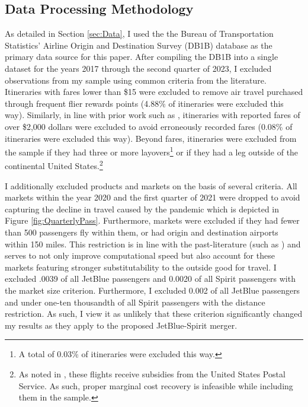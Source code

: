 \documentclass{article}
\begin{document}
\begin{appendices}
    
\setcounter{table}{0}
\setcounter{figure}{0}
\renewcommand{\thetable}{\Alph{section}\arabic{table}}
\renewcommand{\thefigure}{\Alph{section}\arabic{figure}}

	\section{Data Processing Methodology}
	\label{sec:DataProcessing}
	As detailed in Section \ref{sec:Data},	I used the the Bureau of Transportation Statistics' Airline Origin and Destination Survey (DB1B) database as the primary data source for this paper. After compiling the DB1B into a single dataset for the years 2017 through the second quarter of 2023, I excluded observations from my sample using common criteria from the literature. Itineraries with fares lower than \$15 were excluded to remove air travel purchased through frequent flier rewards points (4.88\% of itineraries were excluded this way). Similarly, in line with prior work such as \citet{berry_tracing_2010}, itineraries with reported fares of over \$2,000 dollars were excluded to avoid erroneously recorded fares (0.08\% of itineraries were excluded this way). Beyond fares, itineraries were excluded from the sample if they had three or more layovers\footnote{A total of 0.03\% of itineraries were excluded this way.} or if they had a leg outside of the continental United States.\footnote{As noted in \citet{ciliberto_market_2021}, these flights receive subsidies from the United States Postal Service. As such, proper marginal cost recovery is infeasible while including them in the sample.} 
	
	I additionally excluded products and markets on the basis of several criteria. All markets within the year 2020 and the first quarter of 2021 were dropped to avoid capturing the decline in travel caused by the pandemic which is depicted in Figure \ref{fig:QuarterlyPass}. Furthermore, markets were excluded if they had fewer than 500 passengers fly within them, or had origin and destination airports within 150 miles. This restriction is in line with the past-literature (such as \citet{ciliberto_does_2014}) and serves to not only improve computational speed but also account for these markets featuring stronger substitutability to the outside good for travel. I excluded .0039 of all JetBlue passengers and 0.0020 of all Spirit passengers with the market size criterion. Furthermore, I excluded 0.002 of all JetBlue passengers and under one-ten thousandth of all Spirit passengers with the distance restriction. As such, I view it as unlikely that these criterion significantly changed my results as they apply to the proposed JetBlue-Spirit merger.
    

\end{appendices}
\end{document}
